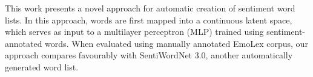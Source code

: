 This work presents a novel approach for automatic creation of sentiment word lists. In this approach, words are first mapped into a continuous latent space, which serves as input to a multilayer perceptron (MLP) trained using sentiment-annotated words. When evaluated using manually annotated EmoLex corpus, our approach compares favourably with SentiWordNet 3.0, another automatically generated word list.
